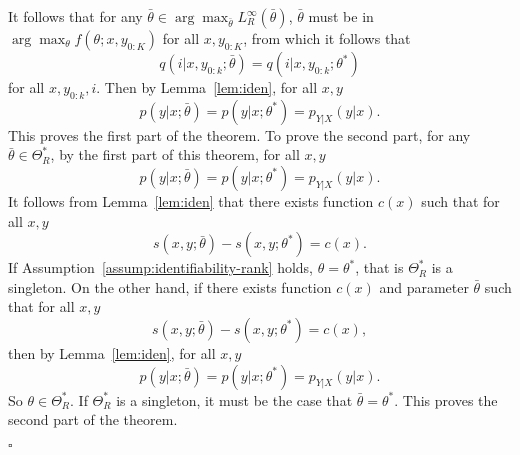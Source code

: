 \documentclass[11pt,a4paper]{article}
\newcommand{\qed}{\square}
\newcommand{\str}[3]{s(#1, #2; #3)}
\begin{document}
It follows that for any $\bar{\theta} \in \arg\max_{\bar{\theta}}
L^{\infty}_R(\bar{\theta})$, $\bar{\theta}$ must be in $\arg\max_{\theta}
f(\theta; x, y_{0:K})$ for all $x, y_{0:K}$, from which it follows
that 
\[
q(i | x, y_{0:k}; \bar{\theta}) = q(i | x, y_{0:k}; \theta^*)
\]
for all $x, y_{0:k}, i$. Then by Lemma~\ref{lem:iden},
for all $x, y$
\[
p(y | x; \bar{\theta}) = p(y | x; \theta^*) = p_{Y|X}(y | x).
\]
This proves the first part of the theorem. To prove the second part, for any $\bar{\theta}\in\Theta^*_R$, by the first part of this theorem, for all $x, y$
\[
p(y | x; \bar{\theta}) = p(y | x; \theta^*) = p_{Y|X}(y | x).
\]
It follows from Lemma~\ref{lem:iden} that there exists function $c(x)$ such that for all $x, y$
\[
\str{x}{y}{\bar{\theta}} - \str{x}{y}{\theta^*} = c(x).
\]
If Assumption~\ref{assump:identifiability-rank} holds, $\theta = \theta^*$, that is $\Theta_R^*$ is a singleton. 
On the other hand, if there exists function $c(x)$ and parameter $\bar{\theta}$ such that for all $x, y$
\[
\str{x}{y}{\bar{\theta}} - \str{x}{y}{\theta^*} = c(x), 
\]
then by Lemma~\ref{lem:iden}, for all $x, y$
\[
p(y | x; \bar{\theta}) = p(y | x; \theta^*) = p_{Y|X}(y | x).
\]
So $\theta \in \Theta^*_R$. If $\Theta^*_R$ is a singleton, it must be the case that $\bar{\theta} = \theta^*$. This proves the second part of the theorem. 

$\qed$
\end{document}
